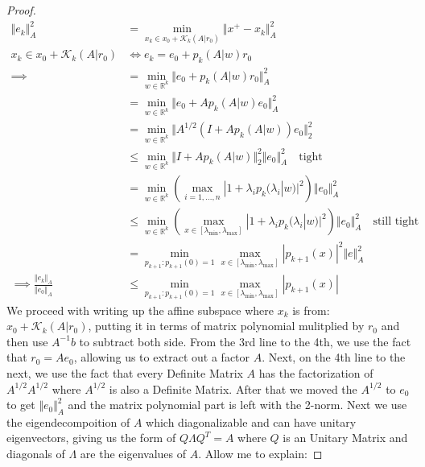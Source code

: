 \documentclass[]{article}
\theoremstyle{definition}
\begin{document}
        \begin{proof}
            \begin{align}
                \Vert e_k\Vert_A^2 & =
                \min_{x_k \in x_0 + \mathcal K_k(A|r_0)}
                \Vert 
                    x^+ - x_k
                \Vert_A^2
                \\
                x_k \in x_0 + \mathcal K_k(A|r_0) 
                & \iff
                e_k = e_0 + p_k(A|w)r_0
                \\
                \implies  &=
                \min_{w\in \mathbb R^k}
                \Vert 
                    e_0 + p_k(A|w)r_0
                \Vert_A^2
                \\
                &= \min_{w\in \mathbb R^k}
                \Vert 
                    e_0 + Ap_k(A|w)e_0
                \Vert_A^2
                \\
                &= \min_{w\in \mathbb R^k}
                \Vert 
                    A^{1/2}(I + Ap_k(A|w))e_0
                \Vert_2^2
                \\
                &\le
                \min_{w\in \mathbb R^k}
                \Vert 
                    I + Ap_k(A|w)
                \Vert_2^2\Vert e_0\Vert_A^2 \quad \text{tight}
                \\
                & = 
                \min_{w\in \mathbb R^k}
                \left(
                    \max_{i = 1, \dots, n}
                    |1 + \lambda_ip_k(\lambda_i|w)|^2
                \right)\Vert e_0\Vert_A^2
                \quad
                \\
                & \le 
                \min_{w\in \mathbb R^k}
                \left(
                    \max_{x\in [\lambda_{\min}, \lambda_{\max}]}
                    |1 + \lambda_ip_k(\lambda_i|w)|^2
                \right)\Vert e_0\Vert_A^2
                \quad \text{still tight}
                \\
                &= \min_{p_{k + 1}: p_{k + 1}(0) = 1}
                \max_{x\in [\lambda_{\min}, \lambda_{\max}]}| p_{k + 1}(x)|^2 \Vert e\Vert_A^2
                \\
                \implies
                \frac{\Vert e_k\Vert_A}{\Vert e_0\Vert_A} &\le 
                \min_{p_{k + 1}: p_{k + 1}(0) = 1}\max_{x\in [\lambda_{\text{min}}, \lambda_{\text{max}}]} |p_{k + 1}(x)|
            \end{align}
            We proceed with writing up the affine subspace where $x_k$ is from: $x_0 + \mathcal K_k(A|r_0)$, putting it in terms of matrix polynomial mulitplied by $r_0$ and then use $A^{-1}b$ to subtract both side. From the 3rd line to the 4th, we use the fact that $r_0 = Ae_0$, allowing us to extract out a factor $A$. Next, on the 4th line to the next, we use the fact that every Definite Matrix $A$ has the factorization of $A^{1/2}A^{1/2}$ where $A^{1/2}$ is also a Definite Matrix. After that we moved the $A^{1/2}$ to $e_0$ to get $\Vert e_0\Vert_A^2$ and the matrix polynomial part is left with the 2-norm. Next we use the eigendecompoition of  $A$ which diagonalizable and can have unitary eigenvectors, giving us the form of $Q\Lambda Q^T = A$ where $Q$ is an Unitary Matrix and diagonals of $\Lambda$ are the eigenvalues of $A$. Allow me to explain: 

\end{proof}
\end{document}
